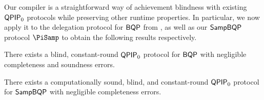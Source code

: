 Our compiler is a straightforward way of achievement blindness with existing $\operatorname{\mathsf{QPIP}}_0$ protocols while preserving other runtime properties.
In particular, we now apply it to the delegation protocol for $\operatorname{\mathsf{BQP}}$ from \cite{parallelrep, alagic2019twomessage},
as well as our $\operatorname{\mathsf{SampBQP}}$ protocol $\PiSamp$ to obtain the following results respectively.

\begin{theorem}
	There exists a blind, constant-round $\operatorname{\mathsf{QPIP}}_0$ protocol for $\operatorname{\mathsf{BQP}}$ with negligible completeness and soundness errors.
\end{theorem}

\begin{theorem}
	There exists a computationally sound, blind, and constant-round $\operatorname{\mathsf{QPIP}}_0$ protocol for $\operatorname{\mathsf{SampBQP}}$ with negligible completeness errors.
\end{theorem}

